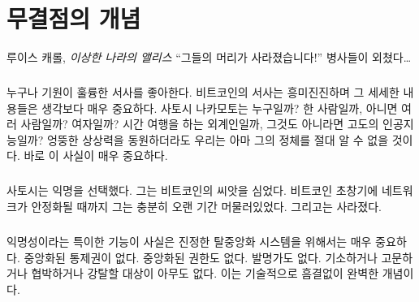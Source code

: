 \chapter{무결점의 개념}
\label{les:5}

\begin{chapquote}{루이스 캐롤, \textit{이상한 나라의 앨리스}}
	\enquote{그들의 머리가 사라졌습니다!} 병사들이 외쳤다\ldots
\end{chapquote}

\paragraph{}
누구나 기원이 훌륭한 서사를 좋아한다. 
비트코인의 서사는 흥미진진하며 그 세세한 내용들은 생각보다 매우 중요하다. 
사토시 나카모토는 누구일까? 한 사람일까, 아니면 여러 사람일까? 여자일까? 시간 여행을 하는 외계인일까, 그것도 아니라면 고도의 인공지능일까? 
엉뚱한 상상력을 동원하더라도 우리는 아마 그의 정체를 절대 알 수 없을 것이다.
바로 이 사실이 매우 중요하다.

\paragraph{}
사토시는 익명을 선택했다. 그는 비트코인의 씨앗을 심었다. 
비트코인 초창기에 네트워크가 안정화될 때까지 그는 충분히 오랜 기간 머물러있었다. 
그리고는 사라졌다.

\paragraph{}
익명성이라는 특이한 기능이 사실은 진정한 탈중앙화 시스템을 위해서는 매우 중요하다.
중앙화된 통제권이 없다. 중앙화된 권한도 없다. 발명가도 없다.
기소하거나 고문하거나 협박하거나 강탈할 대상이 아무도 없다. 
이는 기술적으로 흠결없이 완벽한 개념이다.


